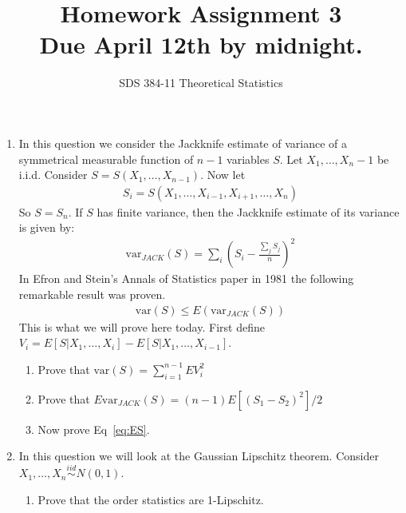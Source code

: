 \documentclass[11pt]{article}
\newcommand{\var}{\text{var}}
\begin{document}
\title{{\bf Homework Assignment 3}\\Due April 12th by midnight.}
\author{SDS 384-11 Theoretical Statistics}

\date{}

\maketitle{}
\begin{enumerate}%
\item 
In this question we consider the Jackknife estimate of variance of a symmetrical measurable function of $n-1$ variables $S$. Let $X_1,\dots,X_n-1$ be i.i.d. Consider $S=S(X_1,\dots,X_{n-1})$. Now let
\begin{align*}
S_i=S(X_1,\dots,X_{i-1},X_{i+1},\dots, X_n)
\end{align*}
So $S=S_n$. If $S$ has finite variance, then the Jackknife estimate of its variance is given by:
\begin{align*}
\var_{JACK}(S)=\sum_i\left(S_i-\frac{\sum_j S_j}{n}\right)^2
\end{align*}
In Efron and Stein's Annals of Statistics paper in 1981 the following remarkable result was proven.
\begin{align}\label{eq:ES}
\var(S)\leq E\left(\var_{JACK}(S)\right)
\end{align}
This is what we will prove here today. First define $V_i=E[S|X_1,\dots,X_i]-E[S|X_1,\dots,X_{i-1}]$. 
\begin{enumerate}
	\item Prove that $\var(S)=\sum_{i=1}^{n-1} E V_i^2$
	\item Prove that $E\var_{JACK}(S)=(n-1)E[(S_1-S_2)^2]/2$
	\item Now prove Eq~\ref{eq:ES}.
\end{enumerate}
\item In this question we will look at the Gaussian Lipschitz theorem. Consider $X_1,\dots, X_n\stackrel{iid}{\sim} N(0,1)$. 
\begin{enumerate}
	\item Prove that the order statistics are 1-Lipschitz.  %

\end{enumerate}
\end{enumerate}
\end{document}
